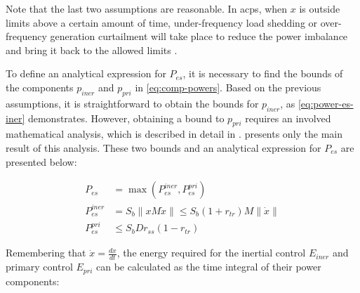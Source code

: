 \documentclass[utf8]{frontiersSCNS} %
\begin{document}
Note that the last two assumptions are reasonable. In \gls{acps}, when $x$ is outside limits above a certain amount of time, under-frequency load shedding or over-frequency generation curtailment will take place to reduce the power imbalance and bring it back to the allowed limits \citep{comissionregulationeuGuidelineElectricityTransmission2017,etoFrequencyControlRequirements2018}. 

To define an analytical expression for $P_{es}$, it is necessary to find the bounds of the components $p_{iner}$ and $p_{pri}$ in \cref{eq:comp-powers}. Based on the previous assumptions, it is straightforward to obtain the bounds for $p_{iner}$, as \cref{eq:power-es-iner} demonstrates. However, obtaining a bound to $p_{pri}$ requires an involved mathematical analysis, which is described in detail in \cite{alvesSufficientConditionsRobust2020}.  presents only the main result of this analysis. These two bounds and an analytical expression for $P_{es}$ are presented below: 

\begin{align}
    P_{es} & = \max(P_{es}^{iner}, P_{es}^{pri}) \label{eq:power-es} \\ 
 	P_{es}^{iner} & = S_b \lVert x M \dot{x} \rVert \le S_b (1 + r_{tr}) M \lVert \dot{x} \rVert \label{eq:power-es-iner} \\
 	P_{es}^{pri} & \le S_b D r_{ss} (1 - r_{tr}) \label{eq:power-es-pri}
\end{align}

Remembering that $ \dot{x} = \frac{dx}{dt}$, the energy required for the inertial control $ E_{iner} $ and primary control $ E_{pri} $ can be calculated as the time integral of their power components:
\end{document}
